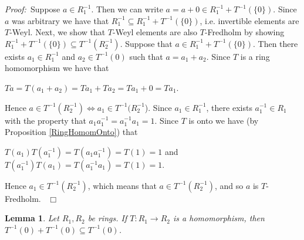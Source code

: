 \documentclass[12pt, oneside]{book}
\newtheorem{lemma}[theorem]{Lemma}
\newcommand{\proof}{{\noindent \it Proof:~}}
\newcommand{\qed}{\hfill ~$\Box$\\}
\begin{document}
\proof \space Suppose $a \in R_1^{-1}$. Then we can write $a=a+0 \in R_1^{-1}+T^{-1}(\{0\})$. 
Since $a$ was arbitrary we have that $R_1^{-1} \subseteq R_1^{-1} +T^{-1}(\{0\})$, i.e. 
invertible elements are $T$-Weyl.
\vskip 0.3cm
\noindent Next, we show that $T$-Weyl elements are also $T$-Fredholm by showing 
$R_1^{-1}+T^{-1}(\{0\}) \subseteq T^{-1}(R_2^{-1})$. Suppose that $a \in R_1^{-1}+T^{-1}(\{0\})$. 
Then there exists $a_1 \in R_1^{-1}$ and $a_2 \in T^{-1}(0)$ such that $a=a_1+a_2$. 
Since $T$ is a ring homomorphism we have that 
\begin{center}
$Ta = T(a_1+a_2) = Ta_1+Ta_2=Ta_1+0=Ta_1$. 
\end{center}
\noindent Hence $a \in T^{-1}(R_2^{-1}) \iff a_1 \in T^{-1}(R^{-1}_2$). Since $a_1 \in R^{-1}_1$, 
there exists  $a_1^{-1} \in R_1$ with the property that $a_1 a_1^{-1} = a_1^{-1} a_1 = 1$. Since $T$ is onto we have 
(by Proposition \ref{RingHomomOnto}) that 
\begin{center}
$T(a_1)T(a^{-1}_1) = T(a_1a^{-1}_1) = T(1) = 1$ and $T(a^{-1}_1)T(a_1) = T(a^{-1}_1a_1) = T(1) = 1.$
\end{center}
Hence $a_1 \in T^{-1}(R^{-1}_2)$, which means that $a \in T^{-1}(R^{-1}_2)$, and so $a$ is $T$-Fredholm. \qed

\begin{lemma} \label{Ker+Ker}
\normalfont
\noindent Let $R_1, R_2$ be rings. If $T: R_1 \to R_2$ is a homomorphism, then $T^{-1}(0)+T^{-1}(0) \subseteq T^{-1}(0)$.
\end{lemma}
\end{document}
